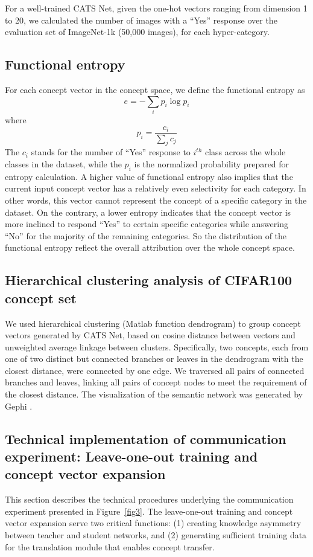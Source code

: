 \documentclass[pdflatex,sn-mathphys-num,lineno]{sn-jnl}%
\begin{document}
\begin{CJK}{UTF8}{gbsn}
For a well-trained CATS Net, given the one-hot vectors ranging from dimension 1 to 20, we calculated the number of images with a “Yes” response over the evaluation set of ImageNet-1k (50,000 images), for each hyper-category.

\subsection{Functional entropy}
For each concept vector in the concept space, we define the functional entropy as 
$$\displaystyle e=-\sum_{i} p_i \log p_i$$
where 
$$\displaystyle p_i = \frac{c_i}{\sum_{j}c_j}$$
The $c_i$ stands for the number of “Yes” response to $i^{th}$ class across the whole classes in the dataset, while the $p_i$ is the normalized probability prepared for entropy calculation. A higher value of functional entropy also implies that the current input concept vector has a relatively even selectivity for each category. In other words, this vector cannot represent the concept of a specific category in the dataset. On the contrary, a lower entropy indicates that the concept vector is more inclined to respond “Yes” to certain specific categories while answering “No” for the majority of the remaining categories. So the distribution of the functional entropy reflect the overall attribution over the whole concept space.

\subsection{Hierarchical clustering analysis of CIFAR100 concept set}
We used hierarchical clustering  (Matlab function dendrogram) to group concept vectors generated by CATS Net, based on cosine distance between vectors and unweighted average linkage between clusters. Specifically, two concepts, each from one of two distinct but connected branches or leaves in the dendrogram with the closest distance, were connected by one edge. We traversed all pairs of connected branches and leaves, linking all pairs of concept nodes to meet the requirement of the closest distance. The visualization of the semantic network was generated by Gephi \cite{bastian_gephi_2009}.

\subsection{Technical implementation of communication experiment: Leave-one-out training and concept vector expansion}
This section describes the technical procedures underlying the communication experiment presented in Figure~\ref{fig3}. The leave-one-out training and concept vector expansion serve two critical functions: (1) creating knowledge asymmetry between teacher and student networks, and (2) generating sufficient training data for the translation module that enables concept transfer.


\end{CJK}
\end{document}
